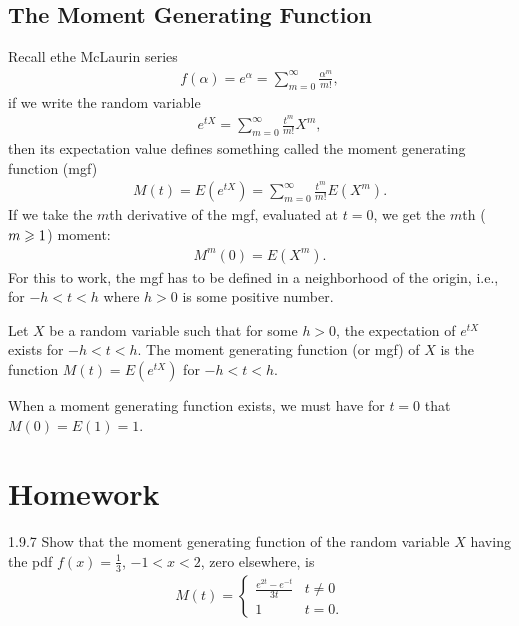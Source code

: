 \subsection{The Moment Generating Function}
Recall ethe McLaurin series
\begin{align*}
    f(\alpha)=e^{\alpha}=\sum\limits_{m=0}^{\infty}\frac{\alpha^m}{m!},
\end{align*}
if we write the random variable
\begin{align*}
    e^{tX}=\sum\limits_{m=0}^{\infty}\frac{t^m}{m!}X^m,
\end{align*}
then its expectation value defines something called the moment generating function (mgf)
\begin{align*}
    M(t)=E(e^{tX})=\sum\limits_{m=0}^{\infty} \frac{t^m}{m!}E(X^m).
\end{align*}
If we take the $m$th derivative of the mgf,
evaluated at $t=0$, we get the $m$th ($m\geqslant 1$) moment:
\begin{align*}
    M^{m}(0)=E(X^m).
\end{align*}
For this to work, the mgf has to be defined in a neighborhood of the origin,
i.e., for $-h<t<h$ where $h>0$
is some positive number. 

\begin{definition}{}{}
    Let $X$ be a random variable such that for some $h>0$,
    the expectation of $e^{tX}$ exists for $-h<t<h$.
    The moment generating function (or mgf) of $X$ is the function $M(t)=E(e^{tX})$ for $-h<t<h$.
\end{definition}
\begin{remark}
    When a moment generating function exists, we must have for $t=0$
    that $M(0)=E(1)=1$.
\end{remark}

\section{Homework}

\begin{exercise}{1.9.7}{}
    Show that the moment generating function of the random variable $X$
    having the pdf $f(x)=\frac{1}{3}$, $-1<x<2$, zero elsewhere, is
    \begin{align*}
        M(t) = \left\{\begin{matrix}
            \frac{e^{2t}-e^{-t}}{3t} & t\neq 0\\
            1 & t=0.
           \end{matrix}\right.
    \end{align*}
\end{exercise}

